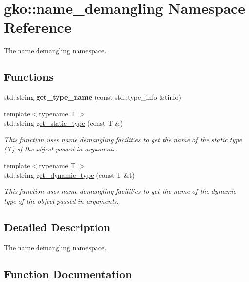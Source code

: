 \hypertarget{namespacegko_1_1name__demangling}{}\section{gko\+:\+:name\+\_\+demangling Namespace Reference}
\label{namespacegko_1_1name__demangling}


The name demangling namespace.  


\subsection*{Functions}
\begin{DoxyCompactItemize}
\item 
\mbox{\label{namespacegko_1_1name__demangling_a8b18513191cd1663159b024f6e1d1af9}} 
std\+::string {\bfseries get\+\_\+type\+\_\+name} (const std\+::type\+\_\+info \&tinfo)
\item 
{\footnotesize template$<$typename T $>$ }\\std\+::string \hyperlink{namespacegko_1_1name__demangling_a305c6bc422a3babdd1179db5b2859ae3}{get\+\_\+static\+\_\+type} (const T \&)
\begin{DoxyCompactList}\small\item\em This function uses name demangling facilities to get the name of the static type ({\ttfamily T}) of the object passed in arguments. \end{DoxyCompactList}\item 
{\footnotesize template$<$typename T $>$ }\\std\+::string \hyperlink{namespacegko_1_1name__demangling_a7469320f9401df05fcad48027569cef0}{get\+\_\+dynamic\+\_\+type} (const T \&t)
\begin{DoxyCompactList}\small\item\em This function uses name demangling facilities to get the name of the dynamic type of the object passed in arguments. \end{DoxyCompactList}\end{DoxyCompactItemize}


\subsection{Detailed Description}
The name demangling namespace. 

\subsection{Function Documentation}
\mbox{\label{namespacegko_1_1name__demangling_a7469320f9401df05fcad48027569cef0}} 
